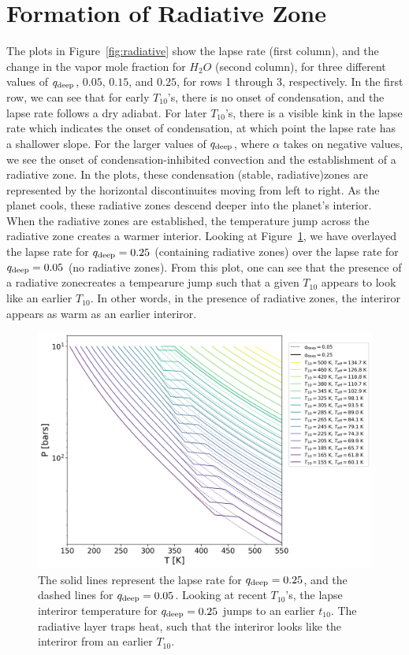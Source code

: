 \documentclass[11pt]{ucscthesisbs}
\begin{document}
\section{Formation of Radiative Zone}
The plots in Figure~\ref{fig:radiative} show the lapse rate (first column), and the change in the vapor mole fraction for $H_{2}O$ (second column), for three different values of $q_{\rm deep}$, $0.05$, $0.15$, and $0.25$, for rows 1 through 3, respectively. In the first row, we can see that for early $T_{10}$'s, there is no onset of condensation, and the lapse rate follows a dry adiabat. For later $T_{10}$'s, there is a visible kink in the lapse rate which indicates the onset of condensation, at which point the lapse rate has a shallower slope. For the larger values of $q_{\rm deep}$, where $\alpha$ takes on negative values, we see the onset of condensation-inhibited convection and the establishment of a radiative zone. In the plots, these condensation (stable, radiative)zones are represented by the horizontal discontinuites moving from left to right. As the planet cools, these radiative zones descend deeper into the planet's interior. When the radiative zones are established, the temperature jump across the radiative zone creates a warmer interior. Looking at Figure~\ref{fig:overlay}, we have overlayed the lapse rate for $q_{\rm deep} = 0.25$ (containing radiative zones) over the lapse rate for $q_{\rm deep}=0.05$ (no radiative zones). From this plot, one can see that the presence of a radiative zonecreates a tempearure jump such that a given $T_{10}$ appears to look like an earlier $T_{10}$. In other words, in the presence of radiative zones, the interiror appears as warm as an earlier interiror.

\begin{figure}[ht]
 \centerline{
  \includegraphics[scale=0.7]{figures/thesis_static_radiative_layer_plot_diff_qdeep_overlay.png}
 }
\caption[Impact of Radiative Layer on T10]
{The solid lines represent the lapse rate for $q_{\rm deep} = 0.25$, and the dashed lines for $q_{\rm deep}=0.05$. Looking at recent $T_{10}$'s, the lapse interiror temperature for $q_{\rm deep} = 0.25$ jumps to an earlier $t_{10}$. The radiative layer traps heat, such that the interiror looks like the interiror from an earlier $T_{10}$.}
\label{fig:overlay}
\end{figure}
\end{document}
